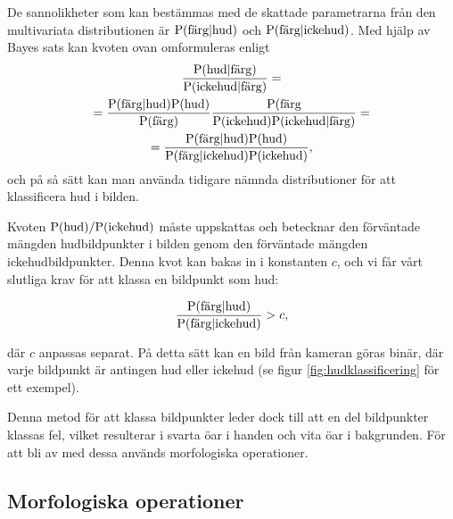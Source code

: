 \documentclass[../rapport_MVEX01-11-05]{subfiles}
\begin{document}
De sannolikheter som kan bestämmas med de skattade parametrarna från den
multivariata distributionen är
$\mathrm{P}(\textrm{färg}|\textrm{hud})$ och
$\mathrm{P}(\textrm{färg}|\textrm{ickehud})$. Med hjälp av Bayes sats
kan kvoten ovan omformuleras enligt
\begin{multline*}
\frac{\mathrm{P}(\textrm{hud}|\textrm{färg})}{\mathrm{P}(\textrm{ickehud}|\textrm{färg})}=\\
=\frac{\mathrm{P}(\textrm{färg}|\textrm{hud})\mathrm{P}(\textrm{hud})}{\mathrm{P}(\textrm{färg})}
 \frac{\mathrm{P}(\textrm{färg}}{\mathrm{P}(\textrm{ickehud})\mathrm{P}(\textrm{ickehud}|\textrm{färg})}=\\
=\frac{\mathrm{P}(\textrm{färg}|\textrm{hud})\mathrm{P}(\textrm{hud})}{\mathrm{P}(\textrm{färg}|\textrm{ickehud})
 \mathrm{P}(\textrm{ickehud})},
\end{multline*}
och på så sätt kan man använda tidigare nämnda distributioner för att
klassificera hud i bilden. 

Kvoten $\mathrm{P}(\textrm{hud})/\mathrm{P}(\textrm{ickehud})$ måste uppskattas
och betecknar
den förväntade mängden hudbildpunkter i bilden genom den förväntade mängden
ickehudbildpunkter. Denna kvot kan bakas in i konstanten $c$, och vi
får vårt slutliga krav för att klassa en bildpunkt som hud:

\begin{equation*}
	\frac{\mathrm{P}(\textrm{färg}|\textrm{hud})}{\mathrm{P}(\textrm{färg}|\textrm{ickehud})} > c,
\end{equation*}

där $c$ anpassas separat. På detta sätt kan en bild från kameran göras
binär, där varje bildpunkt är antingen hud eller ickehud (se figur
\ref{fig:hudklassificering} för ett exempel).

Denna metod för att klassa bildpunkter leder dock till att en del
bildpunkter klassas fel, vilket resulterar i svarta öar i handen
och vita öar i bakgrunden. För att bli av med dessa används
morfologiska operationer.

\subsection{Morfologiska operationer}\label{sec:morph}
\end{document}
